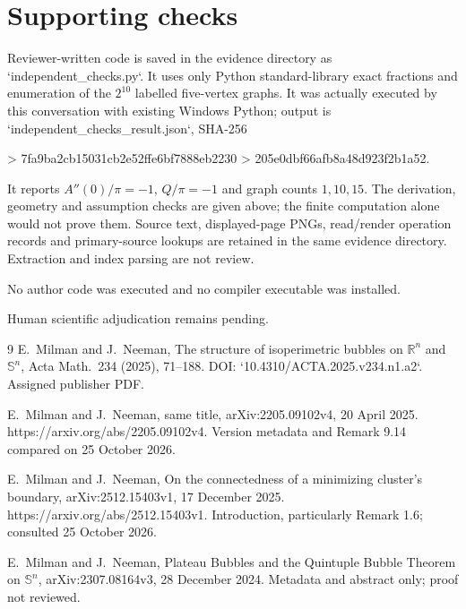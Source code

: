 \documentclass[10pt]{article}
\begin{document}
\section*{Supporting checks}
Reviewer-written code is saved in the evidence directory as `independent\_checks.py`. It uses only Python standard-library exact fractions and enumeration of the \(2^{10}\) labelled five-vertex graphs. It was actually executed by this conversation with existing Windows Python; output is `independent\_checks\_result.json`, SHA-256\par
> 7fa9ba2cb15031cb2e52ffe6bf7888eb2230
> 205e0dbf66afb8a48d923f2b1a52.\par
It reports \(A''(0)/\pi=-1\), \(Q/\pi=-1\) and graph counts \(1,10,15\). The derivation, geometry and assumption checks are given above; the finite computation alone would not prove them. Source text, displayed-page PNGs, read/render operation records and primary-source lookups are retained in the same evidence directory. Extraction and index parsing are not review.\par
No author code was executed and no compiler executable was installed.\par
Human scientific adjudication remains pending.\par
9 E. Milman and J. Neeman, The structure of isoperimetric bubbles on \(\mathbb R^n\) and \(\mathbb S^n\), Acta Math. 234 (2025), 71–188. DOI: `10.4310/ACTA.2025.v234.n1.a2`. Assigned publisher PDF.\par
E. Milman and J. Neeman, same title, arXiv:2205.09102v4, 20 April 2025. https://arxiv.org/abs/2205.09102v4. Version metadata and Remark 9.14 compared on 25 October 2026.\par
E. Milman and J. Neeman, On the connectedness of a minimizing cluster’s boundary, arXiv:2512.15403v1, 17 December 2025. https://arxiv.org/abs/2512.15403v1. Introduction, particularly Remark 1.6; consulted 25 October 2026.\par
E. Milman and J. Neeman, Plateau Bubbles and the Quintuple Bubble Theorem on \(\mathbb S^n\), arXiv:2307.08164v3, 28 December 2024. Metadata and abstract only; proof not reviewed.\par
\end{document}
